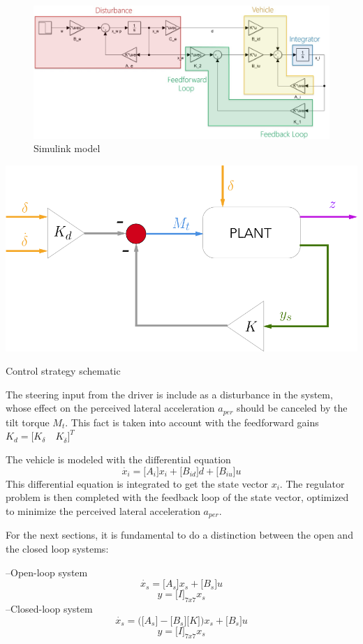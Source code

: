 \begin{figure}[!h]
	\includegraphics[width=1\linewidth]{figs/06/model}
	\caption{Simulink model}
	\label{model}
\end{figure}
\begin{marginfigure}[5cm]
	\includegraphics[width=1.2\linewidth]{figs/06/control2}
	\caption{Control strategy schematic}
\end{marginfigure}
The steering input from the driver is include as a disturbance in the system, whose effect on the perceived lateral acceleration $a_{per}$ should be canceled by the tilt torque $M_{t}$. This fact is taken into account with the feedforward gains $K_{d}=\Big[K_{\delta} \quad K_{\dot{\delta}}\Big]^{T}$

The vehicle is modeled with the differential equation \[\dot{x_{i}}=\Big[A_{i}\Big]x_{i}+\Big[B_{id}\Big]d+\Big[B_{iu}\Big]u\]
This differential equation is integrated to get the state vector $x_{i}$. The regulator problem is then completed with the feedback loop of the state vector, optimized to minimize the perceived lateral acceleration $a_{per}$.

For the next sections, it is fundamental to do a distinction between the open and the closed loop systems:

	\hspace{0.25cm}--Open-loop system
\endminipage\hfill
{}
	\[\dot{x_{s}}=\Big[A_{s}\Big]x_{s}+\Big[B_{s}\Big]u \]\[y=\Big[I\Big]_{7x7}x_{s}\]
\endminipage\hfill
{}
	\hspace{0.25cm}--Closed-loop system
\endminipage\hfill
{}
	\[\dot{x_{s}}=\Big(\big[A_{s}\big]-\big[B_{s}\big]\big[K\big]\Big)x_{s}+\big[B_{s}\big]u \]\[y=\big[I\big]_{7x7}x_{s}\]
\endminipage\hfill

